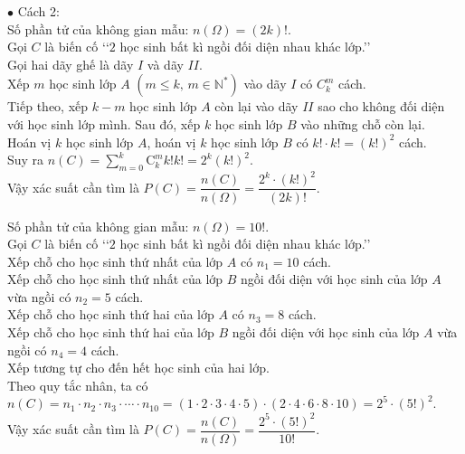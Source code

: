 \begin{vd}
{\begin{tongquat}
			$ \bullet $ Cách 2:\\
			Số phần tử của không gian mẫu: $ n(\Omega) = (2k)! $.\\
			Gọi $ C $ là biến cố \lq\lq $ 2 $ học sinh bất kì ngồi đối diện nhau khác lớp.\rq\rq \\
			Gọi hai dãy ghế là dãy $ I $ và dãy $ II $.\\
			Xếp $ m $ học sinh lớp $ A $ $ (m \leq k ,\, m \in \mathbb{N}^*) $ vào dãy $ I $ có $ C_k^m  $ cách.\\
			Tiếp theo, xếp $ k - m $ học sinh lớp $ A $ còn lại vào dãy $ II $ sao cho không đối diện với học sinh lớp mình.
			Sau đó, xếp $ k $ học sinh lớp $ B $ vào những chỗ còn lại.\\
			Hoán vị $ k $ học sinh lớp $ A $, hoán vị $ k $ học sinh lớp $ B $ có $ k! \cdot k! = {(k!)}^2$ cách.\\
			Suy ra $ n(C) = \sum\limits_{m = 0}^k {\mathrm{C}_k^m k!k!}  = 2^k \left( {k!} \right)^2 $.\\
			Vậy xác suất cần tìm là $ P(C) = \dfrac{n(C)}{n(\Omega)} = \dfrac{2^k \cdot \left( {k!} \right)^{2}}{(2k)!} $.\\
		\end{tongquat}
		\noindent
		Số phần tử của không gian mẫu: $ n(\Omega) = 10! $.\\
		Gọi $ C $ là biến cố \lq\lq $ 2 $ học sinh bất kì ngồi đối diện nhau khác lớp.\rq\rq \\
		Xếp chỗ cho học sinh thứ nhất của lớp $ A $ có $ n_1 = 10 $ cách.\\
		Xếp chỗ cho học sinh thứ nhất của lớp $ B $ ngồi đối diện với học sinh của lớp $ A $ vừa ngồi có $ n_2 = 5 $ cách.\\
		Xếp chỗ cho học sinh thứ hai của lớp $ A $ có $ n_3 = 8 $ cách.\\
		Xếp chỗ cho học sinh thứ hai của lớp $ B $ ngồi đối diện với học sinh của lớp $ A $ vừa ngồi có $ n_4 = 4 $ cách.\\
		Xếp tương tự cho đến hết học sinh của hai lớp.\\
		Theo quy tắc nhân, ta có
		$ n(C) = n_1 \cdot n_2 \cdot n_3 \cdot \cdots \cdot n_{10} =
		\left({1 \cdot 2 \cdot 3 \cdot 4 \cdot 5} \right) \cdot  \left({2 \cdot 4 \cdot 6 \cdot 8 \cdot 10} \right) = 2^5 \cdot \left( {5!} \right)^{2} $.\\
		Vậy xác suất cần tìm là $ P(C) = \dfrac{n(C)}{n(\Omega)} = \dfrac{2^5 \cdot \left( {5!} \right)^{2}}{10!} $.
	}
\end{vd}
